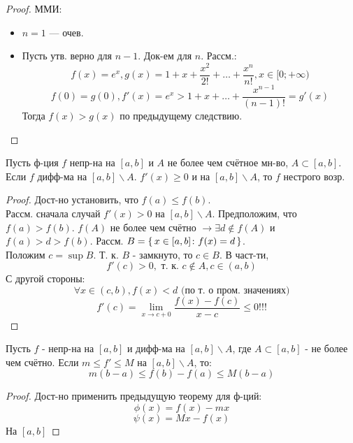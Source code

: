 \begin{proof}
  ММИ:
\begin{itemize}
  \item $n = 1$ --- очев.
  \item Пусть утв. верно для $n - 1$. Док-ем для $n$. Рассм.:
    \[
    f(x) = e^{x}, g(x) = 1 + x + \frac{x^{2}}{2!} + \ldots + \frac{x^{n}}{n!}, x \in [0; +\infty)
    \]
    \[
    f(0) = g(0), f'(x) = e^{x} > 1 + x + \ldots + \frac{x^{n - 1}}{(n - 1)!} = g'(x)
    \]
    Тогда $f(x) > g(x)$ по предыдущему следствию.
\end{itemize}
\end{proof}
\begin{theorem}
Пусть ф-ция $f$ непр-на на $[a, b]$ и $A$ не более чем счётное мн-во, $A \subset [a, b]$. Если $f$ дифф-ма на $[a, b] \backslash A$. $f'(x) \geq 0$ и на $[a, b] \backslash A$, то $f$ нестрого возр.
\end{theorem}
\begin{proof}
Дост-но установить, что $f(a) \leq f(b)$. \\ 

Рассм. сначала случай $f'(x) > 0$ на $[a, b] \backslash A$. Предположим, что $f(a) > f(b)$. $f(A)$ не более чем счётно $\rightarrow \exists d \not \in f(A)$ и $f(a) > d > f(b)$. Рассм. $B = \set{x \in [a, b] \colon f(x) = d}$. \\
Положим $c = \sup B$. Т. к. $B$ - замкнуто, то $c \in B$. В част-ти,
\[
  f'(c) > 0, \text{ т. к. $c \not \in A, c \in (a, b)$}
\]
С другой стороны:
\[
\forall x \in (c, b), f(x) < d \text{ (по т. о пром. значениях)}
\]
\[
f'(c) = \lim_{x\to c + 0} \frac{f(x) - f(c)}{x - c} \leq 0!!!
\]
\end{proof}
\begin{consequence}
Пусть $f$ - непр-на на $[a, b]$ и дифф-ма на $[a, b] \backslash A$, где $A \subset [a, b]$ - не более чем счётно. Если $m \leq f' \leq M$ на $[a, b] \backslash A$, то:
\[
  m(b - a) \leq f(b) - f(a) \leq M(b - a)
\]
\end{consequence}
\begin{proof}
Дост-но применить предыдущую теорему для ф-ций:
\[
\phi(x) = f(x) - mx
\]
\[
\psi(x) = Mx - f(x)
\]
На $[a, b]$
\end{proof}
